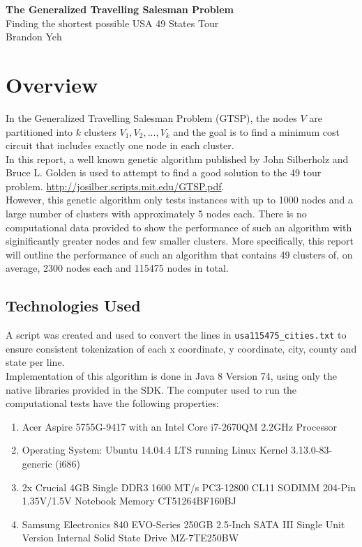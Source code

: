 \documentclass[12pt]{article}
\begin{document}
\begin{center}
\textbf{\LARGE The Generalized Travelling Salesman Problem}\\
\Large Finding the shortest possible USA 49 States Tour\\

\large Brandon Yeh\\
\end{center}

\newpage

\section{Overview}

In the Generalized Travelling Salesman Problem (GTSP), the nodes $V$ are partitioned into $k$ clusters $V_1,V_2,...,V_k$ and the goal is to find a minimum cost circuit that includes exactly one node in each cluster.\\

In this report, a well known genetic algorithm published by John Silberholz and Bruce L. Golden is used to attempt to find a good solution to the 49 tour problem. \url{http://josilber.scripts.mit.edu/GTSP.pdf}.\\

However, this genetic algorithm only tests instances with up to 1000 nodes and a large number of clusters with approximately 5 nodes each. There is no computational data provided to show the performance of such an algorithm with siginificantly greater nodes and few smaller clusters. More specifically, this report will outline the performance of such an algorithm that contains 49 clusters of, on average, 2300 nodes each and 115475 nodes in total.

\subsection{Technologies Used}

A script was created and used to convert the lines in \verb|usa115475_cities.txt| to ensure consistent tokenization of each x coordinate, y coordinate, city, county and state per line.\\

Implementation of this algorithm is done in Java 8 Version 74, using only the native libraries provided in the SDK. The computer used to run the computational tests have the following properties:
\begin{enumerate}
  \item Acer Aspire 5755G-9417 with an Intel Core i7-2670QM 2.2GHz Processor
  \item Operating System: Ubuntu 14.04.4 LTS running Linux Kernel 3.13.0-83-generic (i686)
  \item 2x Crucial 4GB Single DDR3 1600 MT/s PC3-12800 CL11 SODIMM 204-Pin 1.35V/1.5V Notebook Memory CT51264BF160BJ 
  \item Samsung Electronics 840 EVO-Series 250GB 2.5-Inch SATA III Single Unit Version Internal Solid State Drive MZ-7TE250BW 
\end{enumerate}
\end{document}

